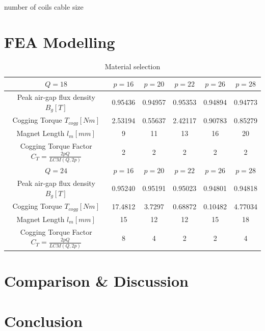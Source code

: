 \documentclass [a4 paper, 11pt, titlepage] {article}
\begin{document}
	
	
	
					number of coils
				cable size
	
	\section{FEA Modelling}
	
	\begin{table}[h]
		\begin{center}
			\begin{tabular}{c|c|c|c|c|c}
				$Q=18$ & $p=16$ & $p=20$ & $p=22$ & $p=26$ & $p=28$ \\
				\hline
				Peak air-gap flux density $B_g [T]$ & 0.95436 & 0.94957 & 0.95353 & 0.94894 & 0.94773 \\
				Cogging Torque $T_{cogg} [Nm]$ & 2.53194 & 0.55637 & 2.42117 & 0.90783 & 0.85279\\
				Magnet Length $l_m [mm]$ & 9 & 11 & 13 & 16 & 20 \\
				Cogging Torque Factor $C_T=\frac{2pQ}{LCM(Q,2p)}$ & 2 & 2 & 2 & 2 & 2 \\
				\hline\hline
				$Q=24$ & $p=16$ & $p=20$ & $p=22$ & $p=26$ & $p=28$ \\
				\hline
				Peak air-gap flux density $B_g [T]$ & 0.95240 & 0.95191 & 0.95023 & 0.94801 & 0.94818 \\
				Cogging Torque $T_{cogg} [Nm]$ & 17.4812 & 3.7297 & 0.68872 & 0.10482 & 4.77034 \\
				Magnet Length $l_m [mm]$ & 15 & 12 & 12 & 15 & 18 \\
				Cogging Torque Factor $C_T=\frac{2pQ}{LCM(Q,2p)}$ & 8 & 4 & 2 & 2 & 4 \\
			\end{tabular}
		\end{center}
		\caption{Material selection}
		\label{tab:materialSelection}
	\end{table}
	
	
	
	
	
	\section{Comparison \& Discussion}
	\section{Conclusion}
\end{document}
